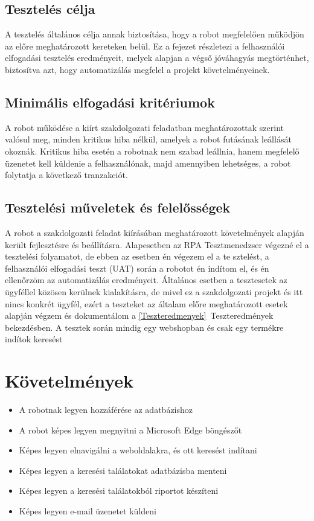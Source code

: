 \documentclass[
]{thesis-ekf}
\theoremstyle{definition}
\theoremstyle{remark}
\begin{document}
\subsection{Tesztelés célja}
A tesztelés általános célja annak biztosítása, hogy a robot megfelelően működjön az előre meghatározott kereteken belül. Ez a fejezet részletezi a felhasználói elfogadási tesztelés eredményeit, melyek alapjan a végső jóváhagyás megtörténhet, biztosítva azt, hogy automatizálás megfelel a projekt követelményeinek.
\subsection{Minimális elfogadási kritériumok}
A robot működése a kiírt szakdolgozati feladatban meghatározottak szerint valósul meg, minden kritikus hiba nélkül, amelyek a robot futásának leállását okoznák. Kritikus hiba esetén a robotnak nem szabad leállnia, hanem megfelelő üzenetet kell küldenie a felhasználónak, majd amennyiben lehetséges, a robot folytatja a következő tranzakciót.
\subsection{Tesztelési műveletek és felelősségek}
A robot a szakdolgozati feladat kiírásában meghatározott követelmények alapján került fejlesztésre és beállításra. Alapesetben az RPA Tesztmenedzser végezné el a tesztelési folyamatot, de ebben az esetben én végezem el a te	sztelést, a felhasználói elfogadási teszt (UAT) során a robotot én indítom el, és én ellenőrzöm az automatizálás eredményeit. Általános esetben a tesztesetek az ügyféllel közösen kerülnek kialakításra, de mivel ez a szakdolgozati projekt és itt nincs konkrét ügyfél, ezért a teszteket az általam előre meghatározott esetek alapján végzem és dokumentálom a \ref{Teszteredmenyek}~Teszteredmények bekezdésben. A tesztek során mindig egy webshopban és csak egy termékre indítok keresést

\section{Követelmények}
\begin{itemize} 
	\item A robotnak legyen hozzáférése az adatbázishoz
	\item A robot képes legyen megnyitni a Microsoft Edge böngészőt
	\item Képes legyen elnavigálni a weboldalakra, és ott keresést indítani \item Képes legyen a keresési találatokat adatbázisba menteni 
	\item Képes legyen a keresési találatokból riportot készíteni 
	\item Képes legyen e-mail üzenetet küldeni 
\end{itemize}
\end{document}
